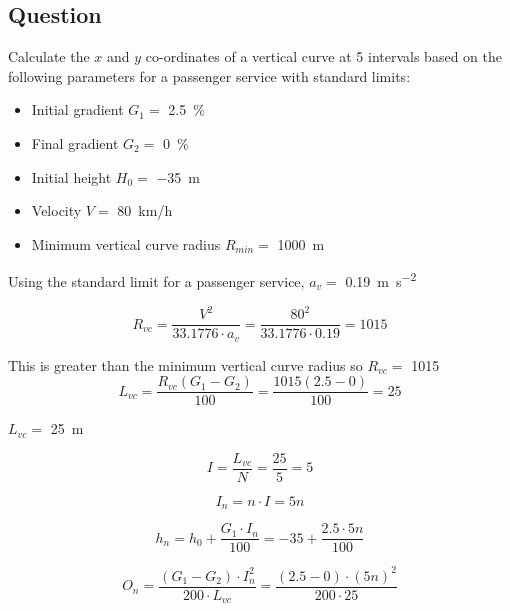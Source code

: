 \documentclass{bcrre_exam}
\begin{document}
\subsection*{Question}
\begin{questions}

\question
Calculate the $x$ and $y$ co-ordinates of a vertical curve at \num{5} intervals based on the following parameters for a passenger service with standard limits:
\begin{itemize}
    \item Initial gradient $G_1=$ \qty{2.5}{\percent}
    \item Final gradient $G_2=$ \qty{0}{\percent}
    \item Initial height $H_0=$ \qty{-35}{m}
    \item Velocity $V=$ \qty{80}{km/h}
    \item Minimum vertical curve radius $R_{min}=$ \qty{1000}{m}
\end{itemize}

\begin{solution}
Using the standard limit for a passenger service, $a_v=$ \qty{0.19}{\meter \per \second \squared}

\begin{equation}
    R_{vc}=\frac{V^2}{33.1776 \cdot a_v}=\frac{80^2}{33.1776 \cdot 0.19} = 1015
\end{equation}

This is greater than the minimum vertical curve radius so $R_{vc}=$ \qty{1015}.

\begin{equation}
    L_{vc} = \frac{R_{vc}(G_1-G_2)}{100}=\frac{1015(2.5-0)}{100}=25
\end{equation}

$L_{vc}=$ \qty{25}{m}

\begin{equation}
    I = \frac{L_{vc}}{N} = \frac{25}{5} = 5
\end{equation}

\begin{equation}
    I_n = n \cdot I = 5n
\end{equation}

\begin{equation}
    h_n = h_0 + \frac{G_1 \cdot I_n}{100}=-35+\frac{2.5 \cdot 5n}{100}
\end{equation}

\begin{equation}
    O_n = \frac{(G_1-G_2) \cdot I_n^2}{200 \cdot L_{vc}} = \frac{(2.5-0)\cdot (5n)^2}{200 \cdot 25}
\end{equation}


\end{solution}
\end{questions}
\end{document}
